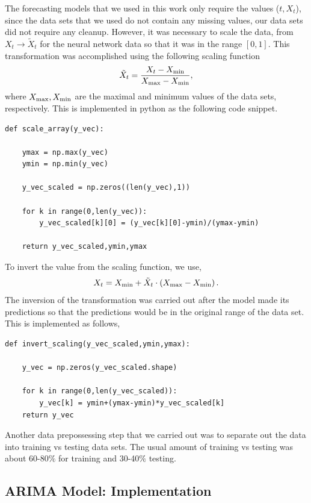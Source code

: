 \documentclass[10pt,a4paper]{article}
\begin{document}
The forecasting models that we used in this work only require the values ($t,X_t$), since the data sets that we used do not contain any missing values, our data sets did not require any cleanup. However, it was necessary to scale the data, from $X_t \rightarrow \tilde{X}_t$ for the neural network data so that it was in the range $[0,1]$. This transformation was accomplished using the following scaling function
\begin{equation}
 \tilde{X}_t = \frac{ X_t - X_{\rm min}}{X_{\rm max} - X_{\rm min}},
\end{equation} 
where $X_{\rm max}, X_{\rm min}$ are the maximal and minimum values of the data sets, respectively. This is implemented in python as the following code snippet.
\begin{lstlisting}
def scale_array(y_vec):
    
    ymax = np.max(y_vec)
    ymin = np.min(y_vec)
    
    y_vec_scaled = np.zeros((len(y_vec),1))
    
    for k in range(0,len(y_vec)):
        y_vec_scaled[k][0] = (y_vec[k][0]-ymin)/(ymax-ymin)
    
    return y_vec_scaled,ymin,ymax
\end{lstlisting}

To invert the value from the scaling function, we use,
\begin{equation}
X_{t} = X_{\rm min} + \tilde{X}_t\cdot \left(X_{\rm max} - X_{\rm min} \right).
\end{equation}
The inversion of the transformation was carried out after the model made its predictions so that the predictions would be in the original range of the data set. This is implemented as follows,
\begin{lstlisting}
def invert_scaling(y_vec_scaled,ymin,ymax):
    
    y_vec = np.zeros(y_vec_scaled.shape)
        
    for k in range(0,len(y_vec_scaled)):
        y_vec[k] = ymin+(ymax-ymin)*y_vec_scaled[k]
    return y_vec
\end{lstlisting}
Another data prepossessing step that we carried out was to separate out the data into training vs testing data sets. The usual amount of training vs testing was about 60-80$\%$ for training and 30-40$\%$ testing.


\subsection{ARIMA Model: Implementation}\label{section: Fitting ARIMA}
\end{document}
